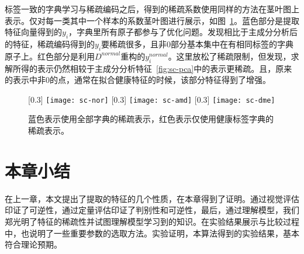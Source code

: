     标签一致的字典学习与稀疏编码之后，得到的稀疏系数使用同样的方法在茎叶图上表示。仅对每一类其中一个样本的系数茎叶图进行展示，如图~\ref{fig:sc-dict}。蓝色部分是提取特征向量得到的$y_i$，字典里所有原子都参与了优化问题。发现相比于主成分分析后的特征，稀疏编码得到的$y_i$要稀疏很多，且非0部分基本集中在有相同标签的字典原子上。红色部分是利用$D^{normal}$重构的$y^{normal}_i$。这里放松了稀疏限制，但发现，求解所得的表示仍然相较于主成分分析特征~\ref{fig:sc-pca}中的表示更稀疏。且，原来的表示中非0的点，通常在拟合健康特征的时候，该部分特征得到了增强。 

    \begin{figure}[h]
      \centering%
      [0.3\textwidth] %
        {\texttt{[image: sc-nor]}} 
      [0.3\textwidth] %
        {\texttt{[image: sc-amd]}} 
      [0.3\textwidth] %
        {\texttt{[image: sc-dme]}} 
      \caption[稀疏编码]{蓝色表示使用全部字典的稀疏表示，红色表示仅使用健康标签字典的稀疏表示。}
      \label{fig:sc-dict}
    \end{figure}

\section{本章小结}
    在上一章，本文提出了提取的特征的几个性质，在本章得到了证明。通过视觉评估印证了可逆性，通过定量评估印证了判别性和可逆性，最后，通过理解模型，我们郑光明了特征的稀疏性并试图理解模型学习到的知识。在实验结果展示与比较过程中，也说明了一些重要参数的选取方法。实验证明，本算法得到的实验结果，基本符合理论预期。


